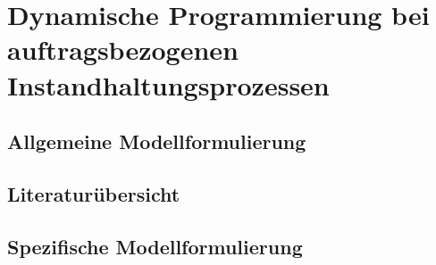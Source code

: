 \chapter{Dynamische Programmierung bei auftragsbezogenen Instandhaltungsprozessen}
\setcounter{footnote}{7}

\section{Allgemeine Modellformulierung}

\section{Literaturübersicht}

\section{Spezifische Modellformulierung}